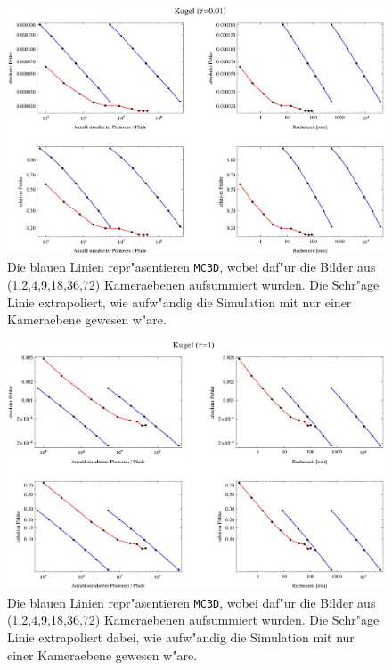 		\begin{figure}
			\centering
			\includegraphics[angle=90,height=1.0\textheight]{sphere1errorplot.eps}
			\caption{Die blauen Linien repr"asentieren \texttt{MC3D}, wobei daf"ur die Bilder aus (1,2,4,9,18,36,72) Kameraebenen aufsummiert wurden. Die Schr"age Linie extrapoliert, wie aufw"andig die Simulation mit nur einer Kameraebene gewesen w"are.}
			\label{fig:sphere1_error}
		\end{figure}
		\begin{figure}
			\centering
			\includegraphics[angle=90,height=1.0\textheight]{sphere2errorplot.eps}
			\caption{Die blauen Linien repr"asentieren \texttt{MC3D}, wobei daf"ur die Bilder aus (1,2,4,9,18,36,72) Kameraebenen aufsummiert wurden. Die Schr"age Linie extrapoliert dabei, wie aufw"andig die Simulation mit nur einer Kameraebene gewesen w"are.}
			\label{fig:sphere2_error}
		\end{figure}
